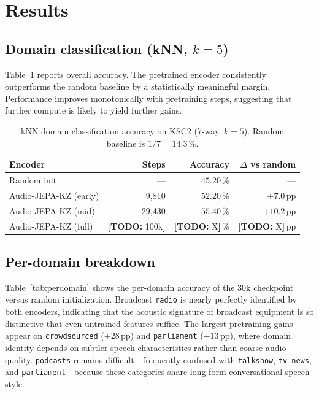 \documentclass[conference]{IEEEtran}
\newcommand{\todo}[1]{{\color{red}\textbf{[TODO:} #1\textbf{]}}}
\begin{document}
\section{Results}

\subsection{Domain classification (kNN, $k=5$)}

Table~\ref{tab:main} reports overall accuracy. The pretrained encoder consistently outperforms the random baseline by a statistically meaningful margin. Performance improves monotonically with pretraining steps, suggesting that further compute is likely to yield further gains.

\begin{table}[t]
\centering
\caption{kNN domain classification accuracy on KSC2 (7-way, $k=5$). Random baseline is $1/7 = 14.3$\,\%.}
\label{tab:main}
\begin{tabular}{lrrr}
\toprule
Encoder & Steps & Accuracy & $\Delta$ vs random \\
\midrule
Random init             & ---    & $45.20$\,\% & ---             \\
Audio-JEPA-KZ (early)   & 9{,}810 & $52.20$\,\% & $+7.0$\,pp     \\
Audio-JEPA-KZ (mid)     & 29{,}430 & $\mathbf{55.40}$\,\% & $\mathbf{+10.2}$\,pp \\
Audio-JEPA-KZ (full)    & \todo{100k} & \todo{X}\,\% & \todo{X}\,pp \\
\bottomrule
\end{tabular}
\end{table}

\subsection{Per-domain breakdown}

Table~\ref{tab:perdomain} shows the per-domain accuracy of the 30k checkpoint versus random initialization. Broadcast \texttt{radio} is nearly perfectly identified by both encoders, indicating that the acoustic signature of broadcast equipment is so distinctive that even untrained features suffice. The largest pretraining gains appear on \texttt{crowdsourced} ($+28$\,pp) and \texttt{parliament} ($+13$\,pp), where domain identity depends on subtler speech characteristics rather than coarse audio quality. \texttt{podcasts} remains difficult---frequently confused with \texttt{talkshow}, \texttt{tv\_news}, and \texttt{parliament}---because these categories share long-form conversational speech style.
\end{document}
